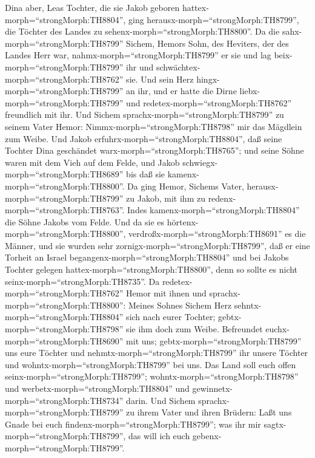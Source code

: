  Dina aber, Leas Tochter, die sie Jakob geboren
hattex-morph=``strongMorph:TH8804'', ging
herausx-morph=``strongMorph:TH8799'', die Töchter des Landes zu
sehenx-morph=``strongMorph:TH8800''.  Da die
sahx-morph=``strongMorph:TH8799'' Sichem, Hemors Sohn, des Heviters, der
des Landes Herr war, nahmx-morph=``strongMorph:TH8799'' er sie und lag
beix-morph=``strongMorph:TH8799'' ihr und
schwächtex-morph=``strongMorph:TH8762'' sie.  Und sein Herz
hingx-morph=``strongMorph:TH8799'' an ihr, und er hatte die Dirne
liebx-morph=``strongMorph:TH8799'' und
redetex-morph=``strongMorph:TH8762'' freundlich mit ihr. 
Und Sichem sprachx-morph=``strongMorph:TH8799'' zu seinem Vater Hemor:
Nimmx-morph=``strongMorph:TH8798'' mir das Mägdlein zum Weibe.
 Und Jakob erfuhrx-morph=``strongMorph:TH8804'', daß seine
Tochter Dina geschändet warx-morph=``strongMorph:TH8765''; und seine
Söhne waren mit dem Vieh auf dem Felde, und Jakob
schwiegx-morph=``strongMorph:TH8689'' bis daß sie
kamenx-morph=``strongMorph:TH8800''.  Da ging Hemor, Sichems
Vater, herausx-morph=``strongMorph:TH8799'' zu Jakob, mit ihm zu
redenx-morph=``strongMorph:TH8763''.  Indes
kamenx-morph=``strongMorph:TH8804'' die Söhne Jakobs vom Felde. Und da
sie es hörtenx-morph=``strongMorph:TH8800'',
verdroßx-morph=``strongMorph:TH8691'' es die Männer, und sie wurden sehr
zornigx-morph=``strongMorph:TH8799'', daß er eine Torheit an Israel
begangenx-morph=``strongMorph:TH8804'' und bei Jakobs Tochter gelegen
hattex-morph=``strongMorph:TH8800'', denn so sollte es nicht
seinx-morph=``strongMorph:TH8735''.  Da
redetex-morph=``strongMorph:TH8762'' Hemor mit ihnen und
sprachx-morph=``strongMorph:TH8800'': Meines Sohnes Sichem Herz
sehntx-morph=``strongMorph:TH8804'' sich nach eurer Tochter;
gebtx-morph=``strongMorph:TH8798'' sie ihm doch zum Weibe. 
Befreundet euchx-morph=``strongMorph:TH8690'' mit uns;
gebtx-morph=``strongMorph:TH8799'' uns eure Töchter und
nehmtx-morph=``strongMorph:TH8799'' ihr unsere Töchter  und
wohntx-morph=``strongMorph:TH8799'' bei uns. Das Land soll euch offen
seinx-morph=``strongMorph:TH8799''; wohntx-morph=``strongMorph:TH8798''
und werbetx-morph=``strongMorph:TH8804'' und
gewinnetx-morph=``strongMorph:TH8734'' darin.  Und Sichem
sprachx-morph=``strongMorph:TH8799'' zu ihrem Vater und ihren Brüdern:
Laßt uns Gnade bei euch findenx-morph=``strongMorph:TH8799''; was ihr
mir sagtx-morph=``strongMorph:TH8799'', das will ich euch
gebenx-morph=``strongMorph:TH8799''. 
